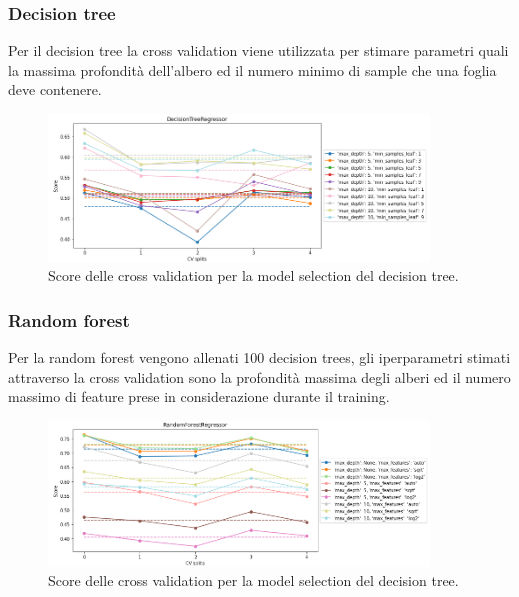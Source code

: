 \documentclass{article}
\begin{document}
\subsubsection{Decision tree}
Per il decision tree la cross validation viene utilizzata per stimare parametri
quali la massima profondità dell'albero ed il numero minimo di sample che una
foglia deve contenere.
\begin{figure}[ht]
	\centering
	\includegraphics[width=0.9\textwidth]{treecv.png}
	\caption{Score delle cross validation per la model selection del decision
	tree.}
\end{figure}

\subsubsection{Random forest}
Per la random forest vengono allenati 100 decision trees, gli iperparametri
stimati attraverso la cross validation sono la profondità massima degli alberi
ed il numero massimo di feature prese in considerazione durante il training.
\begin{figure}[ht]
	\centering
	\includegraphics[width=0.9\textwidth]{ranfcv.png}
	\caption{Score delle cross validation per la model selection del decision
	tree.}
\end{figure}
\end{document}
